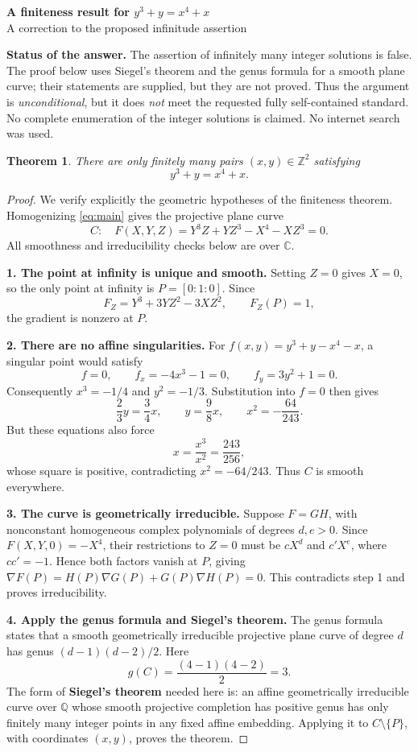 \documentclass[11pt,a4paper]{article}
\newtheorem{theorem}{Theorem}
\newcommand{\Q}{\mathbb{Q}}
\newcommand{\C}{\mathbb{C}}
\newcommand{\Z}{\mathbb{Z}}
\begin{document}
\begin{center}
{\Large\bfseries\color{ink} A finiteness result for \(y^3+y=x^4+x\)}\\[5pt]
{\small A correction to the proposed infinitude assertion}
\end{center}

\textbf{Status of the answer.}
The assertion of infinitely many integer solutions is false. The proof below
uses Siegel's theorem and the genus formula for a smooth plane curve; their
statements are supplied, but they are not proved. Thus the argument is
\emph{unconditional}, but it does \emph{not} meet the requested fully
self-contained standard. No complete enumeration of the integer solutions is
claimed. No internet search was used.

\begin{theorem}
There are only finitely many pairs \((x,y)\in\Z^2\) satisfying
\begin{equation}\label{eq:main}
 y^3+y=x^4+x.
\end{equation}
\end{theorem}

\begin{proof}
We verify explicitly the geometric hypotheses of the finiteness theorem.
Homogenizing \eqref{eq:main} gives the projective plane curve
\[
 C:\quad F(X,Y,Z)=Y^3Z+YZ^3-X^4-XZ^3=0.
\]
All smoothness and irreducibility checks below are over \(\C\).

\textbf{1. The point at infinity is unique and smooth.}
Setting \(Z=0\) gives \(X=0\), so the only point at infinity is
\(P=[0:1:0]\). Since
\[
 F_Z=Y^3+3YZ^2-3XZ^2,\qquad F_Z(P)=1,
\]
the gradient is nonzero at \(P\).

\textbf{2. There are no affine singularities.}
For \(f(x,y)=y^3+y-x^4-x\), a singular point would satisfy
\[
 f=0,\qquad f_x=-4x^3-1=0,\qquad f_y=3y^2+1=0.
\]
Consequently \(x^3=-1/4\) and \(y^2=-1/3\). Substitution into \(f=0\)
then gives
\[
 \frac23y=\frac34x,\qquad
 y=\frac98x,\qquad x^2=-\frac{64}{243}.
\]
But these equations also force
\[
 x=\frac{x^3}{x^2}=\frac{243}{256},
\]
whose square is positive, contradicting \(x^2=-64/243\).
Thus \(C\) is smooth everywhere.

\textbf{3. The curve is geometrically irreducible.}
Suppose \(F=GH\), with nonconstant homogeneous complex polynomials of
degrees \(d,e>0\). Since \(F(X,Y,0)=-X^4\), their restrictions to \(Z=0\)
must be \(cX^d\) and \(c'X^e\), where \(cc'=-1\). Hence both factors
vanish at \(P\), giving
\(\nabla F(P)=H(P)\nabla G(P)+G(P)\nabla H(P)=0\).
This contradicts step 1 and proves irreducibility.

\textbf{4. Apply the genus formula and Siegel's theorem.}
The genus formula states that a smooth geometrically irreducible projective
plane curve of degree \(d\) has genus \((d-1)(d-2)/2\). Here
\[
 g(C)=\frac{(4-1)(4-2)}2=3.
\]
The form of \textbf{Siegel's theorem} needed here is: an affine
geometrically irreducible curve over \(\Q\) whose smooth projective
completion has positive genus has only finitely many integer points in any
fixed affine embedding. Applying it to \(C\setminus\{P\}\), with coordinates
\((x,y)\), proves the theorem.
\end{proof}
\end{document}
